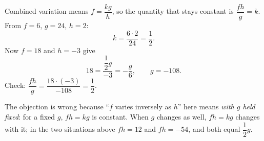 Combined variation means $f=\dfrac{kg}{h}$, so the quantity that stays constant is $\dfrac{fh}{g}=k$. From $f=6$, $g=24$, $h=2$:
\[
k=\dfrac{6\cdot2}{24}=\dfrac{1}{2} .
\]
Now $f=18$ and $h=-3$ give
\[
18=\dfrac{\dfrac{1}{2} g}{-3}=-\dfrac{g}{6},\qquad g=\boxed{-108}.
\]
Check: $\dfrac{fh}{g}=\dfrac{18\cdot(-3)}{-108}=\dfrac{1}{2}$.

The objection is wrong because ``$f$ varies inversely as $h$'' here means \emph{with $g$ held fixed}: for a fixed $g$, $fh=kg$ is constant. When $g$ changes as well, $fh=kg$ changes with it; in the two situations above $fh=12$ and $fh=-54$, and both equal $\dfrac{1}{2} g$.
